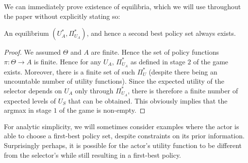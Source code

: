 We can immediately prove existence of equilibria, which we will use throughout the paper without explicitly stating so:
\begin{lemma}[Existence]
	An equilibrium $(U^*_A,\Pi_{U_A}^*)$, and hence a second best policy set always exists.
\end{lemma}

\begin{proof}
	We assumed $\Theta$ and $A$ are finite. Hence the set of policy functions $\pi\colon \Theta \to A$ is finite. Hence for any $U_A$, $\Pi_{U_A}^*$ as defined in stage $2$ of the game exists. Moreover, there is a finite set of such $\Pi_U^*$ (despite there being an uncountable number of utility functions). Since the expected utility of the selector depends on $U_A$ only through $\Pi_{U_A}^*$, there is therefore a finite number of expected levels of $U_S$ that can be obtained. This obviously implies that the argmax in stage $1$ of the game is non-empty.
\end{proof}

For analytic simplicity, we will sometimes consider examples where the actor is able to choose a first-best policy set, despite constraints on its prior information. Surprisingly perhaps, it is possible for the actor's utility function to be different from the selector's while still resulting in a first-best policy. 



